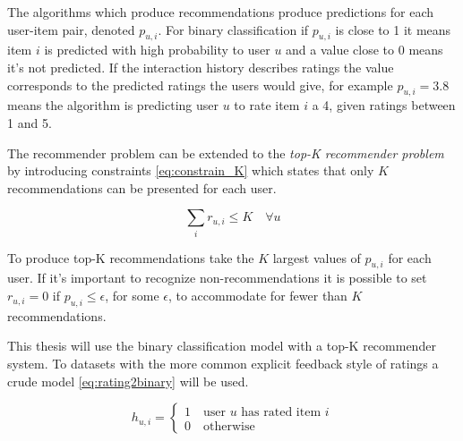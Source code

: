 The algorithms which produce recommendations produce predictions for each user-item pair, denoted $p_{u, i}$.  For binary classification if $p_{u, i}$ is close to 1 it means item $i$ is predicted with high probability to user $u$ and a value close to 0 means it's not predicted. If the interaction history describes ratings the value corresponds to the predicted ratings the users would give, for example $p_{u, i} = 3.8$ means the algorithm is predicting user $u$ to rate item $i$ a 4, given ratings between 1 and 5.

The recommender problem can be extended to the \textit{top-K recommender problem} by introducing constraints \eqref{eq:constrain_K} which states that only $K$ recommendations can be presented for each user.

\begin{equation}\label{eq:constrain_K}
    \sum_i r_{u, i} \leq K \quad \forall u
\end{equation}

To produce top-K recommendations take the $K$ largest values of $p_{u, i}$ for each user. If it's important to recognize non-recommendations it is possible to set $r_{u, i} = 0$ if $p_{u, i} \leq \epsilon$, for some $\epsilon$, to accommodate for fewer than $K$ recommendations.

This thesis will use the binary classification model with a top-K recommender system. To datasets with the more common explicit feedback style of ratings a crude model \eqref{eq:rating2binary} will be used.

\begin{equation} \label{eq:rating2binary}
    h_{u, i} = \begin{cases}
        1 \quad \text{user $u$ has rated item $i$} \\
        0 \quad \text{otherwise}
    \end{cases}
\end{equation}



